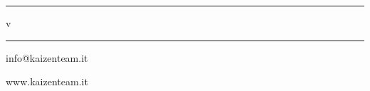 \begin{titlepage}
\begin{center}
	
	\hrule
	\vspace{3mm}
	\Huge{\doctitle{} v\lastversion{}}
	\vspace{3mm}
	\hrule


	\vspace{2cm}

	\begin{minipage}{0.4\textwidth}
		\begin{flushleft} \large
			info@kaizenteam.it
		\end{flushleft}
	\end{minipage}%
	\begin{minipage}{0.4\textwidth}
		\begin{flushright} \large
			www.kaizenteam.it
		\end{flushright}
	\end{minipage}

  \end{center}
\end{titlepage}
